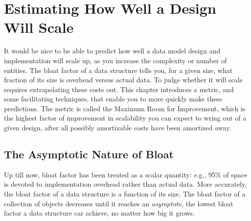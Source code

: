 \chapter{Estimating How Well a Design Will Scale}
\label{chap:estimating-scalability}

It would be nice to be able to predict how well a data model design and
implementation will scale up, as you increase the complexity or number of
entities. The bloat factor of a data structure tells you, for a given size, what
fraction of its size is overhead versus actual data. To judge whether it will
scale requires extrapolating these costs out. This chapter introduces a metric,
and some facilitating techniques, that enable you to more quickly make these
predictions. The metric is called the Maximum Room for Improvement, which is the highest factor of improvement in scalability
you can expect to wring out of a given design, after all possibly amortizable
costs have been amortized away.

\section{The Asymptotic Nature of Bloat}
Up till now, bloat factor has been treated as a scalar quantity: e.g., 95\% of
space is devoted to implementation overhead rather than actual data. More
accurately, the bloat factor of a data structure is a function of its size. The
bloat factor of a collection of objects decreases until it reaches an
\emph{asymptote}, the lowest bloat factor a data structure car achieve, no
matter how big it grows.



